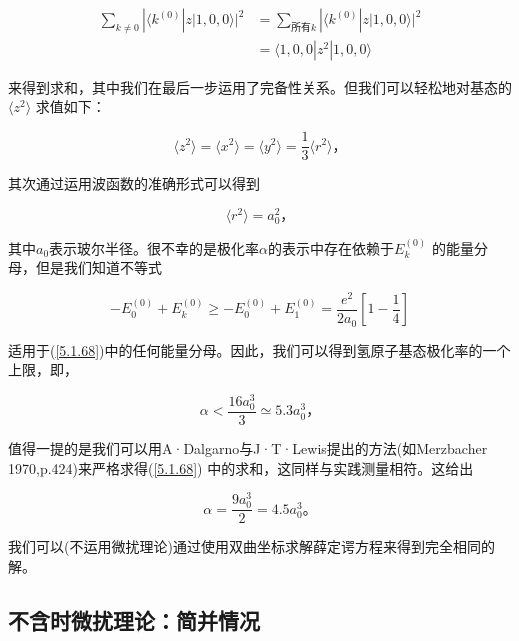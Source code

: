 ﻿\documentclass[UTF8,twoside]{ctexart}
\begin{document}
\begin{equation} \label{5.1.69}
\begin{split}
\displaystyle\sum_{k\neq0}|\langle k^{(0)}|z|1,0,0\rangle|^2 &= \sum_{\text{所有} k}|\langle k^{(0)}|z|1,0,0\rangle|^2\\
& =\langle1,0,0|z^2|1,0,0\rangle
\end{split}
\end{equation}

\noindent 来得到求和，其中我们在最后一步运用了完备性关系。但我们可以轻松地对基态的$\langle z^2\rangle$ 求值如下：

\begin{equation} \label{5.1.70}
\langle z^2\rangle=\langle x^2\rangle=\langle y^2\rangle=\dfrac{1}{3}\langle r^2\rangle\text{，}
\end{equation}

\noindent 其次通过运用波函数的准确形式可以得到

\begin{equation}
\langle r^2\rangle=a_0^2\text{，}
\end{equation}

\noindent 其中$a_0$表示玻尔半径。很不幸的是极化率$\alpha$的表示中存在依赖于$E_k^{(0)}$ 的能量分母，但是我们知道不等式

\begin{equation} \label{5.1.71}
-E_0^{(0)}+E_k^{(0)}\geq -E_0^{(0)}+E_1^{(0)}=\dfrac{e^2}{2a_0}\left[1-\dfrac{1}{4}\right]
\end{equation}

\noindent 适用于(\ref{5.1.68})中的任何能量分母。因此，我们可以得到氢原子基态极化率的一个上限，即，

\begin{equation} \label{5.1.72}
\alpha<\dfrac{16a_0^3}{3}\simeq5.3a_0^3\text{，}
\end{equation}

\noindent 值得一提的是我们可以用A·Dalgarno与J·T·Lewis提出的方法(如Merzbacher 1970,p.424)来严格求得(\ref{5.1.68}) 中的求和，这同样与实践测量相符。这给出

\begin{equation} \label{5.1.73}
\alpha=\dfrac{9a_0^3}{2}=4.5a_0^3\text{。}
\end{equation}

\noindent 我们可以(不运用微扰理论)通过使用双曲坐标求解薛定谔方程来得到完全相同的解。

\subsection{不含时微扰理论：简并情况}
\end{document}
